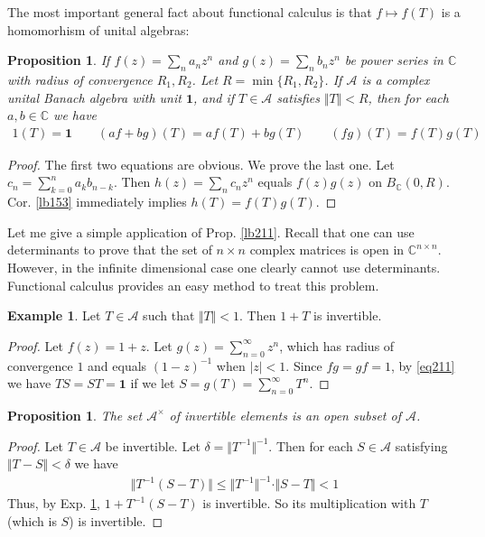 \documentclass[12pt,b5paper,notitlepage]{article}
\theoremstyle{definition}
\newtheorem{eg}[df]{Example}
\theoremstyle{plain}
\newtheorem{pp}[df]{Proposition}
\newcommand{\idt}{\mathbf{1}}
\newcommand{\scr}{\mathscr}
\newcommand{\Cbb}{\mathbb C}
\numberwithin{equation}{section}
\begin{document}
The most important general fact about functional calculus is that $f\mapsto f(T)$ is a homomorhism of unital algebras:

\begin{pp}\label{eq211}
If $f(z)=\sum_n a_nz^n$ and $g(z)=\sum_n b_nz^n$ be power series in $\Cbb$ with radius of convergence $R_1,R_2$. Let $R=\min\{R_1,R_2\}$. If $\scr A$ is a complex unital Banach algebra with unit $\idt$, and if $T\in\scr A$ satisfies $\Vert T\Vert<R$, then for each $a,b\in\Cbb$ we have
\begin{align*}
1(T)=\idt\qquad (af+bg)(T)=af(T)+bg(T)\qquad   (fg)(T)=f(T)g(T)
\end{align*}
\end{pp}


\begin{proof}
The first two equations are obvious. We prove the last one. Let $c_n=\sum_{k=0}^n a_kb_{n-k}$. Then $h(z)=\sum_n c_nz^n$ equals $f(z)g(z)$ on $B_\Cbb(0,R)$. Cor. \ref{lb153} immediately implies $h(T)=f(T)g(T)$.
\end{proof}

Let me give a simple application of Prop. \ref{lb211}. Recall that one can use determinants to prove that the set of $n\times n$ complex matrices is open in $\Cbb^{n\times n}$. However, in the infinite dimensional case one clearly cannot use determinants. Functional calculus provides an easy method to treat this problem.

\begin{eg}\label{lb542}
Let $T\in\scr A$ such that $\Vert T\Vert<1$. Then $1+T$ is invertible.
\end{eg}

\begin{proof}
Let $f(z)=1+z$. Let $g(z)=\sum_{n=0}^\infty z^n$, which has radius of convergence $1$ and equals $(1-z)^{-1}$ when $|z|<1$. Since $fg=gf=1$, by \eqref{eq211} we have $TS=ST=\idt$ if we let $S=g(T)=\sum_{n=0}^\infty T^n$.
\end{proof}


\begin{pp}
The set $\scr A^\times$ of invertible elements is an open subset of $\scr A$.
\end{pp}

\begin{proof}
Let $T\in\scr A$ be invertible. Let $\delta=\Vert T^{-1}\Vert^{-1}$. Then for each $S\in\scr A$ satisfying $\Vert T-S\Vert<\delta$ we have
\begin{align*}
\Vert T^{-1}(S-T)\Vert\leq \Vert T^{-1}\Vert^{-1}\cdot \Vert S-T\Vert <1
\end{align*}
Thus, by Exp. \ref{lb542}, $1+T^{-1}(S-T)$ is invertible. So its multiplication with $T$ (which is $S$) is invertible.
\end{proof}
\end{document}
